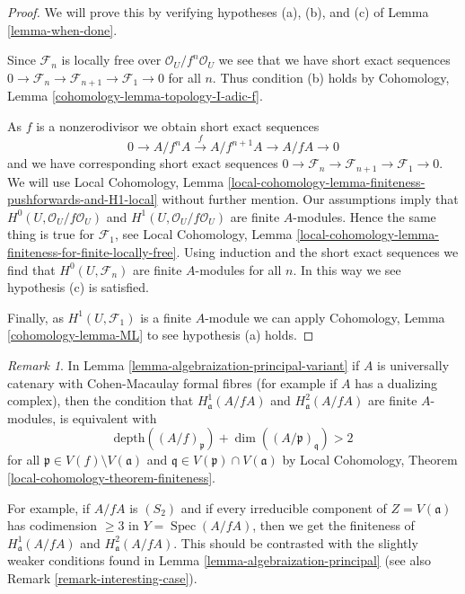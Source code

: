 \documentclass[10pt,a4paper]{amsart}
\theoremstyle{plain}
\theoremstyle{definition}
\theoremstyle{remark}
\newtheorem{remark}[subsection]{Remark}
\numberwithin{equation}{subsection}
\def\Spec{\mathop{\mathrm{Spec}}}
\begin{document}
\begin{proof}
We will prove this by verifying hypotheses (a), (b), and (c) of
Lemma \ref{lemma-when-done}.

\medskip\noindent
Since $\mathcal{F}_n$ is locally free over $\mathcal{O}_U/f^n\mathcal{O}_U$
we see that we have short exact sequences
$0 \to \mathcal{F}_n \to \mathcal{F}_{n + 1} \to \mathcal{F}_1 \to 0$
for all $n$. Thus condition (b) holds by
Cohomology, Lemma \ref{cohomology-lemma-topology-I-adic-f}.

\medskip\noindent
As $f$ is a nonzerodivisor we obtain short exact sequences
$$
0 \to A/f^nA \xrightarrow{f} A/f^{n + 1}A \to A/fA \to 0
$$
and we have corresponding short exact sequences
$0 \to \mathcal{F}_n \to \mathcal{F}_{n + 1} \to \mathcal{F}_1 \to 0$.
We will use
Local Cohomology, Lemma
\ref{local-cohomology-lemma-finiteness-pushforwards-and-H1-local}
without further mention. Our assumptions imply that
$H^0(U, \mathcal{O}_U/f\mathcal{O}_U)$ and
$H^1(U, \mathcal{O}_U/f\mathcal{O}_U)$
are finite $A$-modules. Hence the same thing is true for $\mathcal{F}_1$, see
Local Cohomology, Lemma
\ref{local-cohomology-lemma-finiteness-for-finite-locally-free}.
Using induction and the short exact sequences we find that
$H^0(U, \mathcal{F}_n)$ are finite $A$-modules for all $n$.
In this way we see hypothesis (c) is satisfied.

\medskip\noindent
Finally, as $H^1(U, \mathcal{F}_1)$ is a finite $A$-module
we can apply Cohomology, Lemma \ref{cohomology-lemma-ML}
to see hypothesis (a) holds.
\end{proof}

\begin{remark}
\label{remark-interesting-case-variant}
In Lemma \ref{lemma-algebraization-principal-variant}
if $A$ is universally catenary with Cohen-Macaulay
formal fibres (for example if $A$ has a dualizing complex), then
the condition that
$H^1_\mathfrak a(A/fA)$ and $H^2_\mathfrak a(A/fA)$
are finite $A$-modules, is equivalent with
$$
\text{depth}((A/f)_\mathfrak p) + \dim((A/\mathfrak p)_\mathfrak q) > 2
$$
for all $\mathfrak p \in V(f) \setminus V(\mathfrak a)$
and $\mathfrak q \in V(\mathfrak p) \cap V(\mathfrak a)$
by Local Cohomology, Theorem \ref{local-cohomology-theorem-finiteness}.

\medskip\noindent
For example, if $A/fA$ is $(S_2)$ and if every irreducible
component of $Z = V(\mathfrak a)$ has codimension $\geq 3$
in $Y = \Spec(A/fA)$, then we get the finiteness of
$H^1_\mathfrak a(A/fA)$ and $H^2_\mathfrak a(A/fA)$.
This should be contrasted with the slightly weaker conditions
found in Lemma \ref{lemma-algebraization-principal}
(see also Remark \ref{remark-interesting-case}).
\end{remark}
\end{document}
